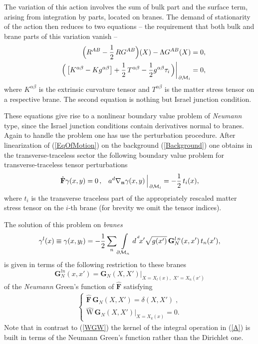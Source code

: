 \documentclass[a4paper,12pt]{article}
\newcommand{\za}{{\alpha}}   %
\newcommand{\zb}{{\beta}}    %
\newcommand{\ZA}{{A}}    %
\newcommand{\ZB}{{B}}    %
\newcommand{\ddim}{{d}}
\newcommand{\dM}{{\partial \cal M}}
\newcommand{\dx}{d^{^{\,\ddim}} \!x}
\newcommand{\un}{\mathbf n} %
\newcommand{\BBox}{\hat{\mathbf{F}}}  %
\newcommand{\Bnabla}{\nabla}
\newcommand{\GrN}{\mathbf{G}_{N}}
\newcommand{\tens}{{\tau}}
\newcommand{\htt}{\gamma}   %
\begin{document}
The variation of this action involves the sum of bulk part and the surface
term, arising from integration by parts, located on branes. The demand
of stationarity of the action then reduces to two equations -- the
requirement that both bulk and brane parts of this variation vanish --
      \begin{eqnarray}
      &&\Big(R^{\ZA\ZB}-\frac12\,RG^{\ZA\ZB}\Big)(X)
      -\Lambda G^{\ZA\ZB}(X)=0 ,\\
      &&\left.\Big(\left[K^{\za\zb}-Kg^{\za\zb}\right]
      +\frac12\,T^{\za\zb}
     -\frac12 g^{\za\zb}\tens_i\,\Big)\right|_{\,\dM_i}=0, \label{EqOfMotion}
    \end{eqnarray}
where $K^{\za\zb}$ is the extrinsic curvature tensor and
$T^{\za\zb}$ is the matter stress tensor on a respective brane.
The second equation is nothing but Israel junction condition.

These equations give rise to a nonlinear boundary value problem of
\textit{Neumann} type, since the Israel junction conditions contain
derivatives normal to branes. Again to handle the problem one has
use the perturbation procedure. After linearization of
(\ref{EqOfMotion}) on the background (\ref{Background}) one obtains
in the transverse-traceless sector the following boundary value
problem for transverse-traceless tensor perturbations
    \begin{equation}
     \BBox \htt(x,y)=0\,,\;\;\;
     a^\ddim\Bnabla_{\un}\htt
     (x,y)\,\Big|_{\,\dM_i}=-\frac12\,t_i(x),  \label{Nbvp for grav}
    \end{equation}
where $t_i$ is the transverse traceless part of the appropriately
rescaled matter stress tensor on the $i$-th brane (for brevity we
omit the tensor indices).

The solution of this problem on {\em branes}
     \begin{equation}
       \htt^l(x)\equiv\htt(x,y_l)=
       -\frac12
       \sum_n \int\limits_{\dM_n}\dx'\sqrt{g(x')}\,
       {\GrN^{l\,n}}(x,x')
       \,t_n(x'),                \label{A}
       \end{equation}
is given in terms of the following restriction to these branes
     \begin{equation}
     \GrN^{ln}(x,x')=\GrN(X,X')
     \Big|_{X=X_l(x),\,\,X'=X_n(x')}           \label{GN}
    \end{equation}
of the {\em Neumann} Green's function of $\BBox$ satisfying
    \begin{eqnarray}
     \left\{ \begin{array}{l}
     \BBox \,\GrN(X,X')=\delta(X,X')\;, \\
     \hat{\mathrm{W}} \,\GrN(X,X')\big|_{X=X_k(x)}\!\!=0.
     \end{array} \right.               \label{NGfbvp}
    \end{eqnarray}
Note that in contrast to (\ref{WGW}) the kernel of the integral
operation in (\ref{A}) is built in terms of the Neumann Green's
function rather than the Dirichlet one.
\end{document}
